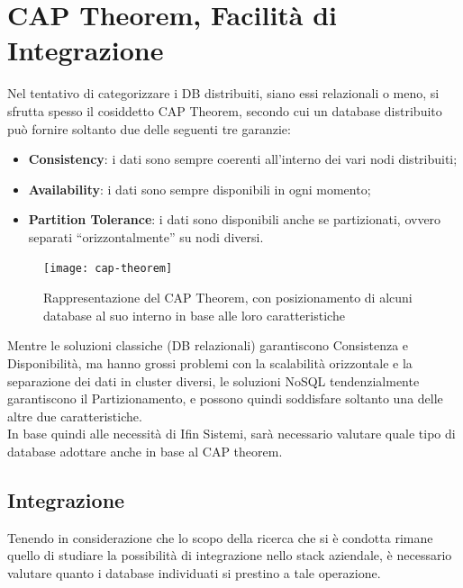 \section{CAP Theorem, Facilità di Integrazione}
\label{sec:cap-theorem-integrazione}

Nel tentativo di categorizzare i DB distribuiti, siano essi relazionali o meno, si sfrutta spesso il cosiddetto CAP Theorem, secondo cui un database distribuito può fornire soltanto due delle seguenti tre garanzie:
\begin{itemize}
    \item \textbf{Consistency}: i dati sono sempre coerenti all'interno dei vari nodi distribuiti;
    \item \textbf{Availability}: i dati sono sempre disponibili in ogni momento;
    \item \textbf{Partition Tolerance}: i dati sono disponibili anche se partizionati, ovvero separati ``orizzontalmente'' su nodi diversi.
\end{itemize}

\vspace{10pt}
\begin{figure}[htbp]
\begin{center}
\texttt{[image: cap-theorem]}
\caption{Rappresentazione del CAP Theorem, con posizionamento di alcuni database al suo interno in base alle loro caratteristiche}
\end{center}
\end{figure}
\vspace{10pt} 

\noindent Mentre le soluzioni classiche (DB relazionali) garantiscono Consistenza e Disponibilità, ma hanno grossi problemi con la scalabilità orizzontale e la separazione dei dati in cluster diversi, le soluzioni NoSQL tendenzialmente garantiscono il Partizionamento, e possono quindi soddisfare soltanto una delle altre due caratteristiche.\\

\noindent In base quindi alle necessità di Ifin Sistemi, sarà necessario valutare quale tipo di database adottare anche in base al CAP theorem.

\subsection{Integrazione}
Tenendo in considerazione che lo scopo della ricerca che si è condotta rimane quello di studiare la possibilità di integrazione nello stack aziendale, è necessario valutare quanto i database individuati si prestino a tale operazione.\\

